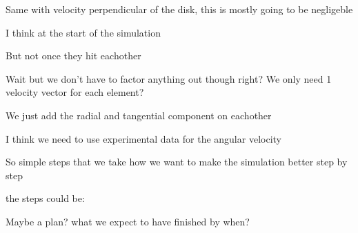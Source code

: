 \documentclass[11pt, english]{article}
\begin{document}
Same with velocity perpendicular of the disk, this is mostly going to be negligeble

I think at the start of the simulation

But not once they hit eachother

Wait but we don't have to factor anything out though right? We only need 1 velocity vector for each element?

We just add the radial and tangential component on eachother

I think we need to use experimental data for the angular velocity

So simple steps that we take  how we want to make the simulation better step by step


the steps could be:



Maybe a plan? what we expect to have finished by when?
\end{document}
